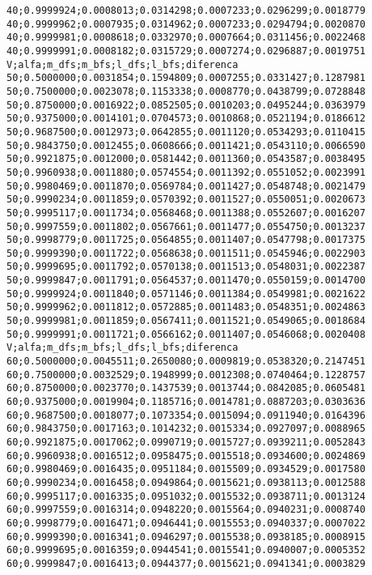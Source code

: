 \documentclass[brazil,times]{abnt}
\begin{document}
{\begin{verbatim}
40;0.9999924;0.0008013;0.0314298;0.0007233;0.0296299;0.0018779
40;0.9999962;0.0007935;0.0314962;0.0007233;0.0294794;0.0020870
40;0.9999981;0.0008618;0.0332970;0.0007664;0.0311456;0.0022468
40;0.9999991;0.0008182;0.0315729;0.0007274;0.0296887;0.0019751
V;alfa;m_dfs;m_bfs;l_dfs;l_bfs;diferenca
50;0.5000000;0.0031854;0.1594809;0.0007255;0.0331427;0.1287981
50;0.7500000;0.0023078;0.1153338;0.0008770;0.0438799;0.0728848
50;0.8750000;0.0016922;0.0852505;0.0010203;0.0495244;0.0363979
50;0.9375000;0.0014101;0.0704573;0.0010868;0.0521194;0.0186612
50;0.9687500;0.0012973;0.0642855;0.0011120;0.0534293;0.0110415
50;0.9843750;0.0012455;0.0608666;0.0011421;0.0543110;0.0066590
50;0.9921875;0.0012000;0.0581442;0.0011360;0.0543587;0.0038495
50;0.9960938;0.0011880;0.0574554;0.0011392;0.0551052;0.0023991
50;0.9980469;0.0011870;0.0569784;0.0011427;0.0548748;0.0021479
50;0.9990234;0.0011859;0.0570392;0.0011527;0.0550051;0.0020673
50;0.9995117;0.0011734;0.0568468;0.0011388;0.0552607;0.0016207
50;0.9997559;0.0011802;0.0567661;0.0011477;0.0554750;0.0013237
50;0.9998779;0.0011725;0.0564855;0.0011407;0.0547798;0.0017375
50;0.9999390;0.0011722;0.0568638;0.0011511;0.0545946;0.0022903
50;0.9999695;0.0011792;0.0570138;0.0011513;0.0548031;0.0022387
50;0.9999847;0.0011791;0.0564537;0.0011470;0.0550159;0.0014700
50;0.9999924;0.0011840;0.0571146;0.0011384;0.0549981;0.0021622
50;0.9999962;0.0011812;0.0572885;0.0011483;0.0548351;0.0024863
50;0.9999981;0.0011859;0.0567411;0.0011521;0.0549065;0.0018684
50;0.9999991;0.0011721;0.0566162;0.0011407;0.0546068;0.0020408
V;alfa;m_dfs;m_bfs;l_dfs;l_bfs;diferenca
60;0.5000000;0.0045511;0.2650080;0.0009819;0.0538320;0.2147451
60;0.7500000;0.0032529;0.1948999;0.0012308;0.0740464;0.1228757
60;0.8750000;0.0023770;0.1437539;0.0013744;0.0842085;0.0605481
60;0.9375000;0.0019904;0.1185716;0.0014781;0.0887203;0.0303636
60;0.9687500;0.0018077;0.1073354;0.0015094;0.0911940;0.0164396
60;0.9843750;0.0017163;0.1014232;0.0015334;0.0927097;0.0088965
60;0.9921875;0.0017062;0.0990719;0.0015727;0.0939211;0.0052843
60;0.9960938;0.0016512;0.0958475;0.0015518;0.0934600;0.0024869
60;0.9980469;0.0016435;0.0951184;0.0015509;0.0934529;0.0017580
60;0.9990234;0.0016458;0.0949864;0.0015621;0.0938113;0.0012588
60;0.9995117;0.0016335;0.0951032;0.0015532;0.0938711;0.0013124
60;0.9997559;0.0016314;0.0948220;0.0015564;0.0940231;0.0008740
60;0.9998779;0.0016471;0.0946441;0.0015553;0.0940337;0.0007022
60;0.9999390;0.0016341;0.0946297;0.0015538;0.0938185;0.0008915
60;0.9999695;0.0016359;0.0944541;0.0015541;0.0940007;0.0005352
60;0.9999847;0.0016413;0.0944377;0.0015621;0.0941341;0.0003829

\end{verbatim}}
\end{document}
